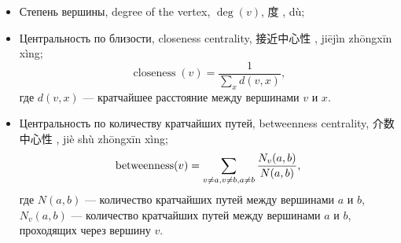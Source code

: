 \documentclass[12pt, a4paper]{article}
\DeclareMathOperator{\closeness}{closeness}
\DeclareMathOperator{\betweenness}{betweenness}
\newcommand{\chinesetext}[1]{\setmainfont{Source Han Sans CN}
#1
\setmainfont{Linux Libertine O}}
\begin{document}
\begin{leftbar}
 \begin{itemize}
  \item Степень вершины, degree of the vertex, $\deg(v)$, \chinesetext{度}, dù;
  \item Центральность по близости, closeness centrality, \chinesetext{接近中心性}, jiējìn zhōngxīn xìng;
  \[
    \closeness(v) = \frac{1}{\sum_x d(v, x)},
  \]
  где $d(v, x)$ — кратчайшее расстояние между вершинами $v$ и $x$.
  \item Центральность по количеству кратчайших путей, betweenness centrality, \chinesetext{介数中心性}, jiè shù zhōngxīn xìng;
  \[
    \betweenness(v) = \sum_{v \neq a, v \neq b, \\ a \neq b} \frac{N_v(a, b)}{N(a, b)},
  \]
  где $N(a, b)$ — количество кратчайших путей между вершинами $a$ и $b$,
  $N_v(a, b)$ — количество кратчайших путей между вершинами $a$ и $b$, проходящих через вершину $v$.
 \end{itemize}

\end{leftbar}
\end{document}
